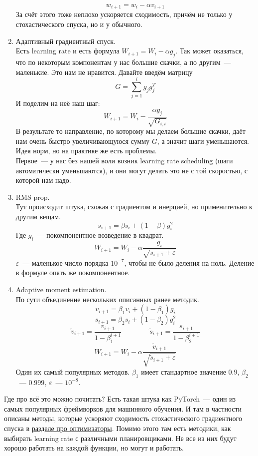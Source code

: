 \documentclass{article}
\begin{document}
\begin{enumerate}
$$        $$
        $$
        w_{i+1}=w_i-\alpha v_{i+1}
        $$
        За счёт этого тоже неплохо ускоряется сходимость, причём не только у стохастического спуска, но и у обычного.
        \item Адаптивный градиентный спуск.\\
        Есть learning rate и есть формула $W_{i+1}=W_i-\alpha g_j$. Так может оказаться, что по некоторым компонентам у нас большие скачки, а по другим~--- маленькие. Это нам не нравится. Давайте введём матрицу
        $$
        G=\sum\limits_{j=1}^ig_jg_j^T
        $$
        И поделим на неё наш шаг:
        $$
        W_{i+1}=W_i-\frac{\alpha g_j}{\sqrt{G_{i,i}}}
        $$
        В результате то направление, по которому мы делаем большие скачки, даёт нам очень быстро увеличивающуюся сумму $G$, а значит шаги уменьшаются. Идея норм, но на практике же есть проблемы.\\
        Первое~--- у нас без нашей воли возник learning rate scheduling (шаги автоматически уменьшаются), и они могут делать это не с той скоростью, с которой нам надо.
        \item RMS prop.\\
        Тут происходит штука, схожая с градиентом и инерцией, но применительно к другим вещам.
        $$
        s_{i+1}=\beta s_i+(1-\beta)g_i^2
        $$
        Где $g_i$~--- покомпонентное возведение в квадрат.
        $$
        W_{i+1}=W_i-\alpha\frac{g_i}{\sqrt{s_{i+1}+\varepsilon}}
        $$
        $\varepsilon$~--- маленькое число порядка $10^{-7}$, чтобы не было деления на ноль. Деление в формуле опять же покомпонентное.
        \item Adaptive moment estimation.\\
        По сути объединение нескольких описанных ранее методик.
        $$
        v_{i+1}=\beta_1v_i+(1-\beta_1)g_i
        $$
        $$
        s_{i+1}=\beta_2s_i+(1-\beta_2)g_i^2
        $$
        $$
        \widetilde v_{i+1}=\frac{v_{i+1}}{1-\beta_1^{i+1}}\qquad\qquad \widetilde s_{i+1}=\frac{s_{i+1}}{1-\beta_2^{i+1}}
        $$
        $$
        W_{i+1}=W_i-\alpha\frac{\widetilde v_{i+1}}{\sqrt{\widetilde s_{i+1}+\varepsilon}}
        $$
        Один их самый популярных методов. $\beta_1$ имеет стандартное значение $0.9$, $\beta_2$~--- $0.999$, $\varepsilon$~--- $10^{-8}$.
    \end{enumerate}
    Где про всё это можно почитать? Есть такая штука как PyTorch~--- один из самых популярных фреймворков для машинного обучения. И там в частности описаны методы, которые ускоряют сходимость стохастического градиентного спуска в \href{https://pytorch.org/docs/stable/optim.html}{разделе про оптимизаторы}. Помимо этого там есть методики, как выбирать learning rate с различными планировщиками. Не все из них будут хорошо работать на каждой функции, но могут и работать.
\end{document}
